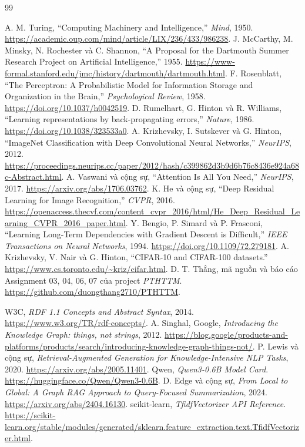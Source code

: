 \documentclass[12pt,a4paper]{report}
\begin{document}
\clearpage
\begin{thebibliography}{99}
 A. M. Turing, ``Computing Machinery and Intelligence,'' \textit{Mind}, 1950. \url{https://academic.oup.com/mind/article/LIX/236/433/986238}.
 J. McCarthy, M. Minsky, N. Rochester và C. Shannon, ``A Proposal for the Dartmouth Summer Research Project on Artificial Intelligence,'' 1955. \url{https://www-formal.stanford.edu/jmc/history/dartmouth/dartmouth.html}.
 F. Rosenblatt, ``The Perceptron: A Probabilistic Model for Information Storage and Organization in the Brain,'' \textit{Psychological Review}, 1958. \url{https://doi.org/10.1037/h0042519}.
 D. Rumelhart, G. Hinton và R. Williams, ``Learning representations by back-propagating errors,'' \textit{Nature}, 1986. \url{https://doi.org/10.1038/323533a0}.
 A. Krizhevsky, I. Sutskever và G. Hinton, ``ImageNet Classification with Deep Convolutional Neural Networks,'' \textit{NeurIPS}, 2012. \url{https://proceedings.neurips.cc/paper/2012/hash/c399862d3b9d6b76c8436e924a68c-Abstract.html}.
 A. Vaswani và cộng sự, ``Attention Is All You Need,'' \textit{NeurIPS}, 2017. \url{https://arxiv.org/abs/1706.03762}.
 K. He và cộng sự, ``Deep Residual Learning for Image Recognition,'' \textit{CVPR}, 2016. \url{https://openaccess.thecvf.com/content_cvpr_2016/html/He_Deep_Residual_Learning_CVPR_2016_paper.html}.
 Y. Bengio, P. Simard và P. Frasconi, ``Learning Long-Term Dependencies with Gradient Descent is Difficult,'' \textit{IEEE Transactions on Neural Networks}, 1994. \url{https://doi.org/10.1109/72.279181}.
 A. Krizhevsky, V. Nair và G. Hinton, ``CIFAR-10 and CIFAR-100 datasets.'' \url{https://www.cs.toronto.edu/~kriz/cifar.html}.
 D. T. Thắng, mã nguồn và báo cáo Assignment 03, 04, 06, 07 của project \textit{PTHTTM}. \url{https://github.com/duongthang2710/PTHTTM}.

 W3C, \textit{RDF 1.1 Concepts and Abstract Syntax}, 2014.
\url{https://www.w3.org/TR/rdf-concepts/}.
 A. Singhal, Google, \textit{Introducing the Knowledge Graph: things, not strings}, 2012.
\url{https://blog.google/products-and-platforms/products/search/introducing-knowledge-graph-things-not/}.
 P. Lewis và cộng sự, \textit{Retrieval-Augmented Generation for Knowledge-Intensive NLP Tasks}, 2020.
\url{https://arxiv.org/abs/2005.11401}.
 Qwen, \textit{Qwen3-0.6B Model Card}.
\url{https://huggingface.co/Qwen/Qwen3-0.6B}.
 D. Edge và cộng sự, \textit{From Local to Global: A Graph RAG Approach to Query-Focused Summarization}, 2024.
\url{https://arxiv.org/abs/2404.16130}.
 scikit-learn, \textit{TfidfVectorizer API Reference}.
\url{https://scikit-learn.org/stable/modules/generated/sklearn.feature_extraction.text.TfidfVectorizer.html}.
\end{thebibliography}
\end{document}
